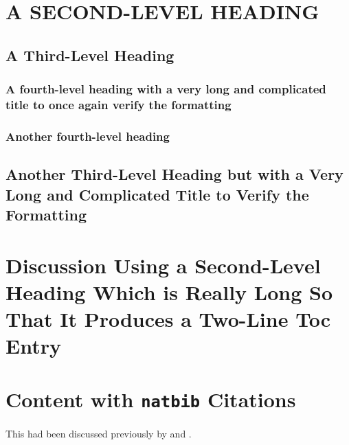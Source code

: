 


\lipsum[6]

\section{A SECOND-LEVEL HEADING}
\lipsum[7-9]

\subsection{A Third-Level Heading}
\lipsum[10]
\subsubsection{A fourth-level heading with a very long and complicated title
to once again verify the formatting}
\lipsum[10-12]
\subsubsection{Another fourth-level heading}
\lipsum[10-12]

\subsection{Another Third-Level Heading but with a Very Long and
  Complicated Title to Verify the Formatting}
\lipsum[13-15]

\section{Discussion Using a Second-Level Heading
  Which is Really Long So That It Produces a Two-Line
  Toc Entry}
\lipsum[10-12]


\section{Content with \texttt{natbib} Citations}

This had been discussed previously by \citep{bullwinkle.1990} and
\citet{winkle.1991}. \lipsum[22-25]


\endinput

